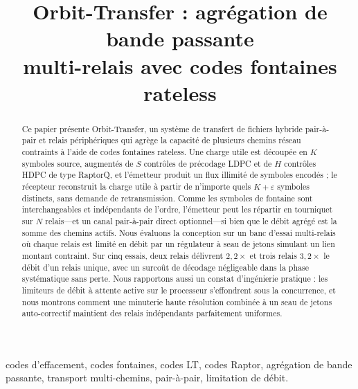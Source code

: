 \documentclass[conference]{IEEEtran}
\begin{document}
\title{Orbit-Transfer : agrégation de bande passante\\ multi-relais avec codes fontaines rateless}

\author{
}

\maketitle

\begin{abstract}
Ce papier présente Orbit-Transfer, un système de transfert de fichiers hybride
pair-à-pair et relais périphériques qui agrège la capacité de plusieurs chemins
réseau contraints à l'aide de codes fontaines rateless. Une charge utile est
découpée en $K$ symboles source, augmentés de $S$ contrôles de précodage LDPC
et de $H$ contrôles HDPC de type RaptorQ, et l'émetteur produit un flux
illimité de symboles encodés ; le
récepteur reconstruit la charge utile à partir de n'importe quels
$K+\varepsilon$ symboles distincts, sans demande de retransmission. Comme les
symboles de fontaine sont interchangeables et indépendants de l'ordre,
l'émetteur peut les répartir en tourniquet sur $N$ relais---et un canal
pair-à-pair direct optionnel---si bien que le débit agrégé est la somme des
chemins actifs. Nous évaluons la conception sur un banc d'essai multi-relais où
chaque relais est limité en débit par un régulateur à seau de jetons simulant un
lien montant contraint. Sur cinq essais, deux relais délivrent $2{,}2\times$ et
trois relais $3{,}2\times$ le débit d'un relais unique, avec un surcoût de
décodage négligeable dans la phase systématique sans perte. Nous rapportons
aussi un constat d'ingénierie pratique : les limiteurs de débit à attente
active sur le processeur s'effondrent sous la concurrence, et nous montrons
comment une minuterie haute résolution combinée à un seau de jetons
auto-correctif maintient des relais indépendants parfaitement uniformes.
\end{abstract}

\begin{IEEEkeywords}
codes d'effacement, codes fontaines, codes LT, codes Raptor, agrégation de
bande passante, transport multi-chemins, pair-à-pair, limitation de débit.
\end{IEEEkeywords}
\end{document}
